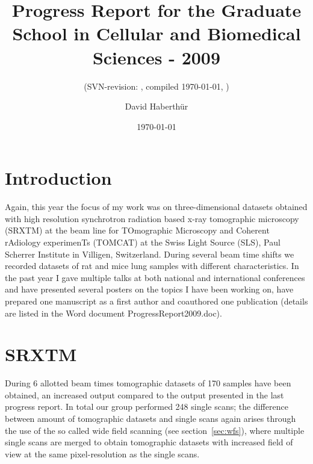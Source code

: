 \documentclass[a4paper,twoside,DIV=calc]{scrartcl}
\title{Progress Report for the Graduate School in Cellular and Biomedical Sciences - 2009}
\subtitle{(SVN-revision: \svnkw{LastChangedRevision}, compiled \today, \thistime)}
\author{David Haberth\"{u}r}
\date{\today}
\begin{document}
\maketitle

\section{Introduction}
Again, this year the focus of my work was on three-dimensional datasets obtained with high resolution synchrotron radiation based x-ray tomographic microscopy (SRXTM) at the beam line for TOmographic Microscopy and Coherent rAdiology experimenTs (TOMCAT) at the Swiss Light Source (SLS), Paul Scherrer Institute in Villigen, Switzerland. During several beam time shifts we recorded datasets of rat and mice lung samples with different characteristics. In the past year I gave multiple talks at both national and international conferences and have presented several posters on the topics I have been working on, have prepared one manuscript as a first author and coauthored one publication (details are listed in the Word document ProgressReport2009.doc).

\section{SRXTM}\label{sec:srxtm}
During 6 allotted beam times tomographic datasets of 170 samples have been obtained, an increased output compared to the output presented in the last progress report. In total our group performed 248 single scans; the difference between amount of tomographic datasets and single scans again arises through the use of the so called wide field scanning (see section~\ref{sec:wfs}), where multiple single scans are merged to obtain tomographic datasets with increased field of view at the same pixel-resolution as the single scans.
\end{document}
